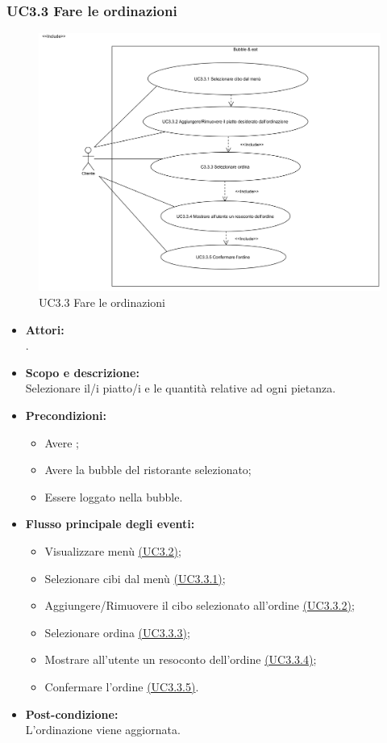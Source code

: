 \subsubsection{UC3.3 Fare le ordinazioni} \label{UC3.3}

\begin{figure}[H]
	\centering
	\includegraphics[width=15cm]{../../documenti/AnalisiDeiRequisiti/Diagrammi_img/uc3_3.png}
	\caption{UC3.3 Fare le ordinazioni}
\end{figure}

\begin{itemize}
	\item \textbf{Attori:}
	\\.
	\item \textbf{Scopo e descrizione:} 
	\\Selezionare il/i piatto/i e le quantità relative ad ogni pietanza.
	\item \textbf{Precondizioni:}
	\begin{itemize}
		\item Avere ;
		\item Avere la bubble del ristorante selezionato;
		\item Essere loggato nella bubble.
	\end{itemize}
	\item \textbf{Flusso principale degli eventi:}
	\begin{itemize}
		\item Visualizzare menù \hyperref[UC3.2]{(UC3.2)};
		\item Selezionare cibi dal menù \hyperref[UC3.3.1]{(UC3.3.1)};
		\item Aggiungere/Rimuovere il cibo selezionato all’ordine \hyperref[UC3.3.2]{(UC3.3.2)};
		\item Selezionare ordina \hyperref[UC3.3.3]{(UC3.3.3)};
		\item Mostrare all’utente un resoconto dell’ordine \hyperref[UC3.3.4]{(UC3.3.4)};
		\item Confermare l’ordine \hyperref[UC3.3.5]{(UC3.3.5)}.
	\end{itemize}
	\item \textbf{Post-condizione:}
	\\L’ordinazione viene aggiornata.
\end{itemize}

